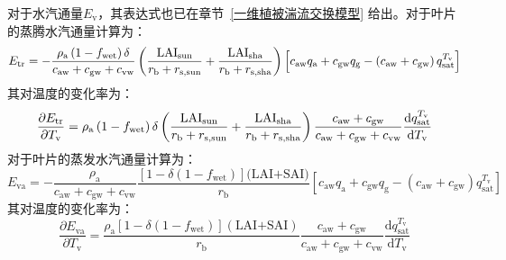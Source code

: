 对于水汽通量$E_{\mathrm{v}}$，其表达式也已在章节~\ref{一维植被湍流交换模型} 给出。对于叶片的蒸腾水汽通量计算为：
\begin{equation}
  E_{\mathrm{tr}} = -\frac{\rho_{\mathrm{a}}\left(1-f_{\mathrm{w e t}}\right)\delta }{c_{\mathrm{aw}}+c_{\mathrm{gw}}+c_{\mathrm{vw}}}\left( \frac{\rm LAI_{\mathrm{sun}}}{r_{\mathrm{b}} + r_{\mathrm{s,\rm sun}}} + \frac{\rm LAI_{\mathrm{sha}}}{r_{\mathrm{b}} + r_{\mathrm{s,\rm sha}}} \right) \left[c_{\mathrm{aw}} q_{\mathrm{a}}+c_{\mathrm{gw}} q_{\mathrm{g}}-\left(c_{\mathrm{aw}}+c_{\mathrm{gw}}\right) q_{\mathrm{s a t}}^{T_{\mathrm{v}}}\right]
\end{equation}
其对温度的变化率为：
\begin{equation}
  \frac{\partial E_{\mathrm{tr}}}{\partial T_{\mathrm{v}}} = \rho_{\mathrm{a}} \left(1-f_{\mathrm{w e t}}\right) \delta \left( \frac{\rm LAI_{\mathrm{sun}}}{r_{\mathrm{b}} + r_{\mathrm{s, \rm sun}}} + \frac{\rm LAI_{\mathrm{sha}}}{r_{\mathrm{b}} + r_{\mathrm{s,\rm sha}}} \right)\frac{c_{\mathrm{aw}}+c_{\mathrm{gw}}}{c_{\mathrm{aw}}+c_{\mathrm{gw}}+c_{\mathrm{vw}}} \frac{{\mathrm {d}} q_{\mathrm{s a t}}^{T_{\mathrm{v}}}}{{\mathrm {d}} T_{\mathrm{v}}}
\end{equation}
对于叶片的蒸发水汽通量计算为：
\begin{equation}
  E_{\mathrm{va}} = -\frac{\rho_{\mathrm{a}}}{c_{\mathrm{aw}}+c_{\mathrm{gw}}+c_{\mathrm{vw}}} \frac{\left[1-\delta\left(1-f_{\mathrm{w e t}}\right)\right](\text {LAI+SAI)}}{r_{\mathrm{b}}}\left[c_{\mathrm{aw}} q_{\mathrm{a}}+c_{\mathrm{gw}} q_{\mathrm{g}}-\left(c_{\mathrm{aw}}+c_{\mathrm{gw}}\right) q_{\mathrm{sat}}^{T_{\mathrm{v}}}\right]
\end{equation}
其对温度的变化率为：
\begin{equation}
  \frac{\partial E_{\mathrm{va}}}{\partial T_{\mathrm{v}}} = \frac{\rho_{\mathrm{a}}\left[1-\delta\left(1-f_{\mathrm{w e t}}\right)\right](\text {LAI+SAI})}{r_{\mathrm{b}}} \frac{c_{\mathrm{aw}}+c_{\mathrm{gw}}}{c_{\mathrm{aw}}+c_{\mathrm{gw}}+c_{\mathrm{vw}}} \frac{{\mathrm {d}} q_{\mathrm{s a t}}^{T_{\mathrm{v}}}}{{\mathrm {d}} T_{\mathrm{v}}}
\end{equation}

